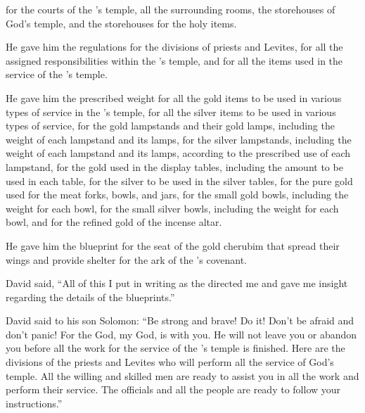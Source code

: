 {for the courts
of the
{}’s
temple,
all
the surrounding
rooms,
the storehouses
of God’s
temple,
and the storehouses
for the holy items.
\par }{\PP {}He gave him the regulations for the divisions
of priests
and Levites,
for all
the assigned
responsibilities
within the
{}’s
temple,
and for all
the items
used in the service
of the
{}’s
temple.
\par }{\PP {}He gave him the prescribed weight
for all
the gold
items
to be used in various
types of service
in the
{}’s
temple, for all
the silver
items
to be used in various
types
of service,
for
the gold
lampstands
and their gold
lamps,
including the weight
of each
lampstand
and its lamps,
for the silver
lampstands,
including the weight
of each lampstand
and its lamps,
according to the prescribed use
of each
lampstand,
for the
gold
used in the display
tables,
including the amount
to be used in each table,
for the silver
to be used in the silver
tables,
for the pure
gold
used for the meat forks,
bowls,
and jars,
for the small gold
bowls,
including the weight
for each
bowl,
for the small silver
bowls,
including the weight
for each
bowl,
and for the refined
gold
of the incense
altar.
\par }{\PP He gave him the blueprint
for the seat
of the gold
cherubim
that spread
their wings and provide shelter
for the ark
of the
{}’s
covenant.
\par }{\PP {}David said, “All
of this I put in writing
as the
{}
directed me and gave me insight
regarding the details
of the blueprints.”
\par }{\PP {}David
said
to his son
Solomon: “Be strong
and brave! Do
it! Don’t
be afraid
and don’t
panic! For
the {}
God,
my God,
is with
you. He will not
leave
you or
abandon
you before
all
the work
for the service
of the
{}’s
temple
is finished.
Here
are the divisions
of the priests
and Levites
who will perform all
the service
of God’s
temple.
All
the willing
and skilled
men are ready to assist you in all
the work
and perform
their service.
The officials
and all
the people
are ready to follow your instructions.”

}
